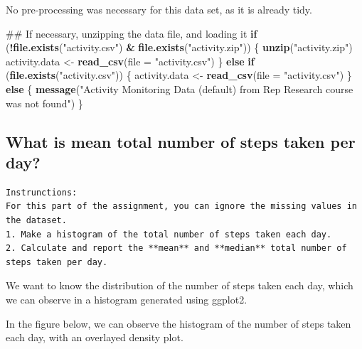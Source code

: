 \documentclass[]{article}
\newenvironment{Shaded}{\begin{snugshade}}{\end{snugshade}}
\newcommand{\KeywordTok}[1]{\textcolor[rgb]{0.13,0.29,0.53}{\textbf{#1}}}
\newcommand{\DataTypeTok}[1]{\textcolor[rgb]{0.13,0.29,0.53}{#1}}
\newcommand{\StringTok}[1]{\textcolor[rgb]{0.31,0.60,0.02}{#1}}
\newcommand{\ControlFlowTok}[1]{\textcolor[rgb]{0.13,0.29,0.53}{\textbf{#1}}}
\newcommand{\OperatorTok}[1]{\textcolor[rgb]{0.81,0.36,0.00}{\textbf{#1}}}
\newcommand{\NormalTok}[1]{#1}
\begin{document}
No pre-processing was necessary for this data set, as it is already
tidy.

\begin{Shaded}
\begin{Highlighting}[]
\NormalTok{## If necessary, unzipping the data file, and loading it}
\ControlFlowTok{if}\NormalTok{ (}\OperatorTok{!}\KeywordTok{file.exists}\NormalTok{(}\StringTok{"activity.csv"}\NormalTok{) }\OperatorTok{&}\StringTok{ }\KeywordTok{file.exists}\NormalTok{(}\StringTok{"activity.zip"}\NormalTok{)) \{}
    \KeywordTok{unzip}\NormalTok{(}\StringTok{"activity.zip"}\NormalTok{)}
\NormalTok{    activity.data <-}\StringTok{ }\KeywordTok{read_csv}\NormalTok{(}\DataTypeTok{file =} \StringTok{"activity.csv"}\NormalTok{)}
\NormalTok{\} }\ControlFlowTok{else} \ControlFlowTok{if}\NormalTok{ (}\KeywordTok{file.exists}\NormalTok{(}\StringTok{"activity.csv"}\NormalTok{)) \{}
\NormalTok{    activity.data <-}\StringTok{ }\KeywordTok{read_csv}\NormalTok{(}\DataTypeTok{file =} \StringTok{"activity.csv"}\NormalTok{)}
\NormalTok{\} }\ControlFlowTok{else}\NormalTok{ \{}
    \KeywordTok{message}\NormalTok{(}\StringTok{"Activity Monitoring Data (default) from Rep Research course was not found"}\NormalTok{)}
\NormalTok{\}}
\end{Highlighting}
\end{Shaded}

\subsection{What is mean total number of steps taken per
day?}\label{what-is-mean-total-number-of-steps-taken-per-day}

\begin{verbatim}
Instrunctions:
For this part of the assignment, you can ignore the missing values in the dataset.  
1. Make a histogram of the total number of steps taken each day.
2. Calculate and report the **mean** and **median** total number of steps taken per day.
\end{verbatim}

We want to know the distribution of the number of steps taken each day,
which we can observe in a histogram generated using ggplot2.

In the figure below, we can observe the histogram of the number of steps
taken each day, with an overlayed density plot.
\end{document}
